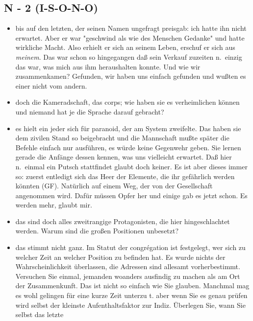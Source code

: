\documentclass[
]{article}
\author{}
\date{\vspace{-2.5em}}
\providecommand{\tightlist}{%
  \setlength{\itemsep}{0pt}\setlength{\parskip}{0pt}}
\begin{document}
\subsection{N - 2 (I-S-O-N-O)}\label{n---2-i-s-o-n-o}

\begin{itemize}
\tightlist
\item
  bis auf den letzten, der seinen Namen ungefragt preisgab: ich hatte
  ihn nicht erwartet. Aber er war "geschwind als wie des Menschen
  Gedanke" und hatte wirkliche Macht. Also erhielt er sich an seinem
  Leben, erschuf er sich aus \emph{meinem}. Das war schon so hingegangen
  daß sein Verkauf zuzeiten n.~einzig das war, was mich aus ihm
  heraushalten konnte. Und wie wir zusammenkamen? Gefunden, wir haben
  uns einfach gefunden und wußten es einer nicht vom andern.\\
\item
  doch die Kameradschaft, das corps; wie haben sie es verheimlichen
  können und niemand hat je die Sprache darauf gebracht?\\
\item
  es hielt ein jeder sich für paranoid, der am System zweifelte. Das
  haben sie dem zivilen Stand so beigebracht und die Mannschaft mußte
  später die Befehle einfach nur ausführen, es würde keine Gegenwehr
  geben. Sie lernen gerade die Anfänge dessen kennen, was uns vielleicht
  erwartet. Daß hier n.~einmal ein Putsch stattfindet glaubt doch
  keiner. Es ist aber dieses immer so: zuerst entledigt sich das Heer
  der Elemente, die ihr gefährlich werden könnten (GF). Natürlich auf
  einem Weg, der von der Gesellschaft angenommen wird. Dafür müssen
  Opfer her und einige gab es jetzt schon. Es werden mehr, glaubt mir.\\
\item
  das sind doch alles zweitrangige Protagonisten, die hier
  hingeschlachtet werden. Warum sind die großen Positionen unbesetzt?\\
\item
  das stimmt nicht ganz. Im Statut der congrégation ist festgelegt, wer
  sich zu welcher Zeit an welcher Position zu befinden hat. Es wurde
  nichts der Wahrscheinlichkeit überlassen, die Adressen sind allesamt
  vorherbestimmt. Versuchen Sie einmal, jemanden woanders ausfindig zu
  machen als am Ort der Zusammenkunft. Das ist nicht so einfach wie Sie
  glauben. Manchmal mag es wohl gelingen für eine kurze Zeit unterzu t.
  aber wenn Sie es genau prüfen wird selbst der kleinste
  Aufenthaltsfaktor zur Indiz. Überlegen Sie, wann Sie selbst das letzte

\end{itemize}
\end{document}
